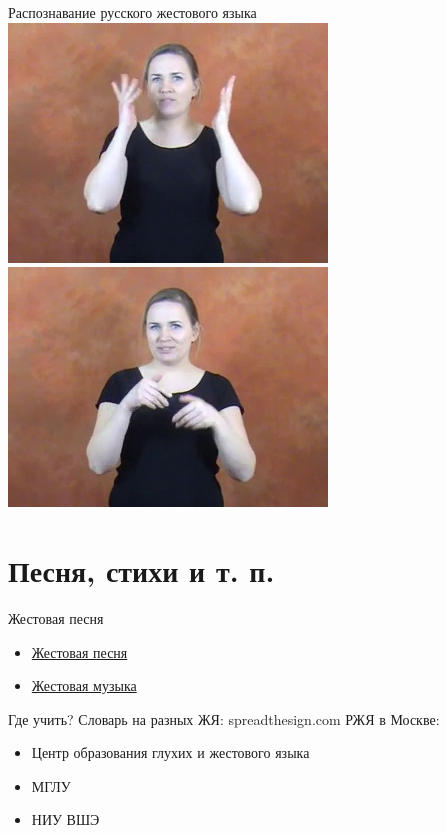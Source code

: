 \documentclass[13pt, t]{beamer}
\begin{document}
\begin{frame}{Распознавание русского жестового языка}
    \includegraphics[width=0.49\linewidth]{images/vljubit'sja_frame1.jpg}
    \includegraphics[width=0.49\linewidth]{images/vljubit'sja_frame2.jpg}
\end{frame}

\section{Песня, стихи и т. п.} %
\begin{frame}{Жестовая песня}
\begin{itemize}
    \item \href{https://www.youtube.com/watch?v=n-lNtm1lKsw}{Жестовая песня}
    \item \href{https://youtu.be/EuD2iNVMS_4?t=285}{Жестовая музыка}
\end{itemize}
\end{frame}

\begin{frame}{Где учить?}
Словарь на разных ЖЯ: spreadthesign.com
РЖЯ в Москве:
\begin{itemize}
    \item Центр образования глухих и жестового языка
    \item МГЛУ
    \item НИУ ВШЭ
\end{itemize}

\end{frame}

\end{document}
